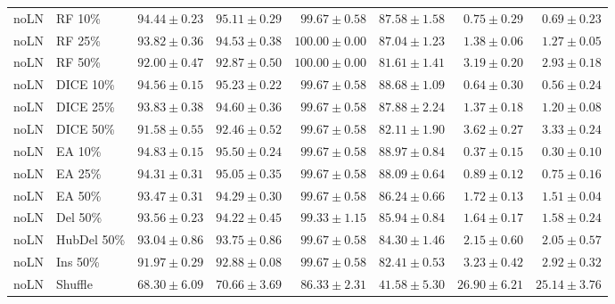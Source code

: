 {\begin{longtable}{llrrrrrr}
noLN & RF 10\% & $94.44\pm0.23$ & $95.11\pm0.29$ & $99.67\pm0.58$ & $87.58\pm1.58$ & $0.75\pm0.29$ & $0.69\pm0.23$ \\
noLN & RF 25\% & $93.82\pm0.36$ & $94.53\pm0.38$ & $100.00\pm0.00$ & $87.04\pm1.23$ & $1.38\pm0.06$ & $1.27\pm0.05$ \\
noLN & RF 50\% & $92.00\pm0.47$ & $92.87\pm0.50$ & $100.00\pm0.00$ & $81.61\pm1.41$ & $3.19\pm0.20$ & $2.93\pm0.18$ \\
noLN & DICE 10\% & $94.56\pm0.15$ & $95.23\pm0.22$ & $99.67\pm0.58$ & $88.68\pm1.09$ & $0.64\pm0.30$ & $0.56\pm0.24$ \\
noLN & DICE 25\% & $93.83\pm0.38$ & $94.60\pm0.36$ & $99.67\pm0.58$ & $87.88\pm2.24$ & $1.37\pm0.18$ & $1.20\pm0.08$ \\
noLN & DICE 50\% & $91.58\pm0.55$ & $92.46\pm0.52$ & $99.67\pm0.58$ & $82.11\pm1.90$ & $3.62\pm0.27$ & $3.33\pm0.24$ \\
noLN & EA 10\% & $94.83\pm0.15$ & $95.50\pm0.24$ & $99.67\pm0.58$ & $88.97\pm0.84$ & $0.37\pm0.15$ & $0.30\pm0.10$ \\
noLN & EA 25\% & $94.31\pm0.31$ & $95.05\pm0.35$ & $99.67\pm0.58$ & $88.09\pm0.64$ & $0.89\pm0.12$ & $0.75\pm0.16$ \\
noLN & EA 50\% & $93.47\pm0.31$ & $94.29\pm0.30$ & $99.67\pm0.58$ & $86.24\pm0.66$ & $1.72\pm0.13$ & $1.51\pm0.04$ \\
noLN & Del 50\% & $93.56\pm0.23$ & $94.22\pm0.45$ & $99.33\pm1.15$ & $85.94\pm0.84$ & $1.64\pm0.17$ & $1.58\pm0.24$ \\
noLN & HubDel 50\% & $93.04\pm0.86$ & $93.75\pm0.86$ & $99.67\pm0.58$ & $84.30\pm1.46$ & $2.15\pm0.60$ & $2.05\pm0.57$ \\
noLN & Ins 50\% & $91.97\pm0.29$ & $92.88\pm0.08$ & $99.67\pm0.58$ & $82.41\pm0.53$ & $3.23\pm0.42$ & $2.92\pm0.32$ \\
noLN & Shuffle & $68.30\pm6.09$ & $70.66\pm3.69$ & $86.33\pm2.31$ & $41.58\pm5.30$ & $26.90\pm6.21$ & $25.14\pm3.76$ \\
\end{longtable}
}

